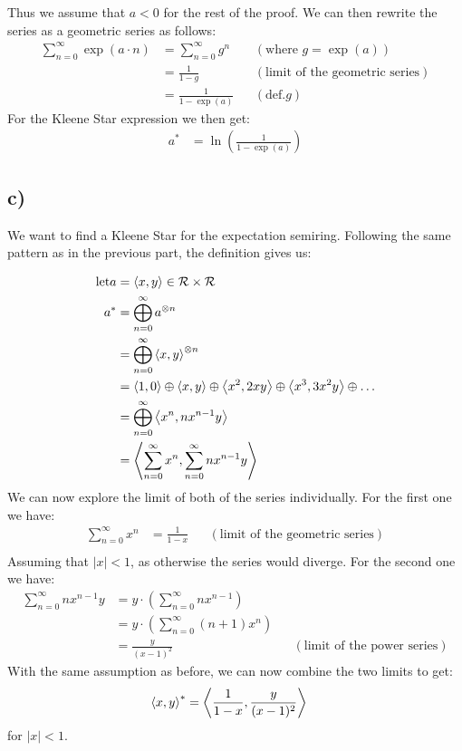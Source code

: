 \documentclass[a4paper,12pt]{ETHexercise}
\begin{document}
Thus we assume that $a < 0$ for the rest of the proof. We can then rewrite the series as a geometric series as follows: 
\begin{align}
    \sum^\infty_{n=0} \exp(a \cdot n) &= \sum^\infty_{n=0} g^n &&(\text{where } g = \exp(a))\\
    &= \frac{1}{1-g} &&(\text{limit of the geometric series})\\
    &= \frac{1}{1-\exp(a)} &&(\text{def.} g)  
\end{align}
For the Kleene Star expression we then get:
\begin{align*}
    a^* &= \ln \left( \frac{1}{1-\exp(a)} \right)
\end{align*}
\subsection*{c)}
We want to find a Kleene Star for the expectation semiring. Following the same pattern as in the previous part, the definition gives us:

\begin{align}
    \text{let} a &= \left\langle x, y\right\rangle \in \mathcal{R} \times \mathcal{R} \\
    a^* &= \bigoplus^{\infty}_{n=0}a^{\otimes n}\\
    &= \bigoplus^{\infty}_{n=0}\left\langle x, y\right\rangle^{\otimes n}\\
    &= \left\langle1, 0\right\rangle \oplus \left\langle x, y\right\rangle \oplus \left\langle x^2, 2xy\right\rangle \oplus \left\langle x^3, 3x^2y\right\rangle \oplus \dots\\
    &= \bigoplus^{\infty}_{n=0}\left\langle x^n, nx^{n-1}y\right\rangle\\
    &= \left\langle\sum^{\infty}_{n=0} x^n, \sum^{\infty}_{n=0} nx^{n-1}y\right\rangle
\end{align}
We can now explore the limit of both of the series individually. For the first one we have:
\begin{align}
    \sum^{\infty}_{n=0} x^n &= \frac{1}{1-x} &&(\text{limit of the geometric series})\\
\end{align}
Assuming that $|x| < 1$, as otherwise the series would diverge. For the second one we have:
\begin{align}
    \sum^{\infty}_{n=0} nx^{n-1}y  
    &= y \cdot (\sum^{\infty}_{n=0} nx^{n-1}) \\
    &= y \cdot (\sum^{\infty}_{n=0} (n+1)x^{n})  \\
    &= \frac{y}{(x-1)^2} &&(\text{limit of the power series})
\end{align}
With the same assumption as before, we can now combine the two limits to get:
\begin{align*}
    \left\langle x, y\right\rangle^* &= \left\langle\frac{1}{1-x}, \frac{y}{(x-1)^2}\right\rangle
\end{align*}
for $|x| < 1$.
\end{document}

